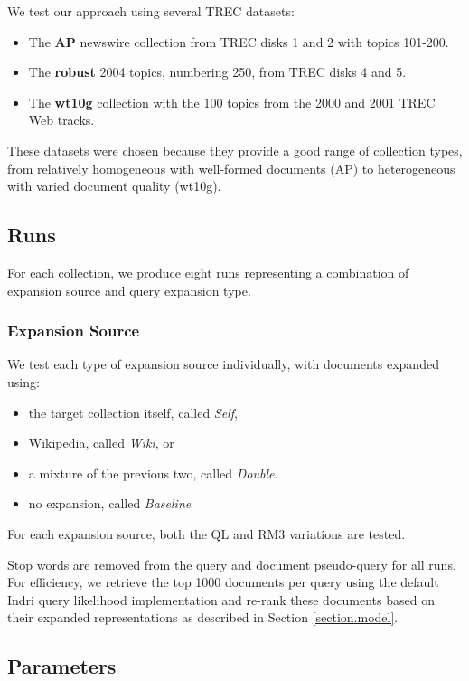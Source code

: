 \documentclass{sig-alternate}
\begin{document}
We test our approach using several TREC datasets:
\begin{itemize}
	\item The \textbf{AP} newswire collection from TREC disks 1 and 2 with topics 101-200.
	\item The \textbf{robust} 2004 topics, numbering 250, from TREC disks 4 and 5.
	\item The \textbf{wt10g} collection with the 100 topics from the 2000 and 2001 TREC Web tracks.
\end{itemize}

These datasets were chosen because they provide a good range of collection types, from relatively homogeneous with well-formed documents (AP) to heterogeneous with varied document quality (wt10g).

\subsection{Runs}\label{section.evaluation.runs}

For each collection, we produce eight runs representing a combination of expansion source and query expansion type.

\subsubsection{Expansion Source}\label{section.evaluation.runs.expansion}

We test each type of expansion source individually, with documents expanded using:
\begin{itemize}
	\item the target collection itself, called \textit{Self},
	\item Wikipedia, called \textit{Wiki}, or
	\item a mixture of the previous two, called \textit{Double}.
	\item no expansion, called \textit{Baseline}
\end{itemize}

For each expansion source, both the QL and RM3 variations are tested.

Stop words are removed from the query and document pseudo-query for all runs. For efficiency, we retrieve the top 1000 documents per query using the default Indri query likelihood implementation and re-rank these documents based on their expanded representations as described in Section \ref{section.model}.

\subsection{Parameters}\label{section.evaluation.parameters}
\end{document}
